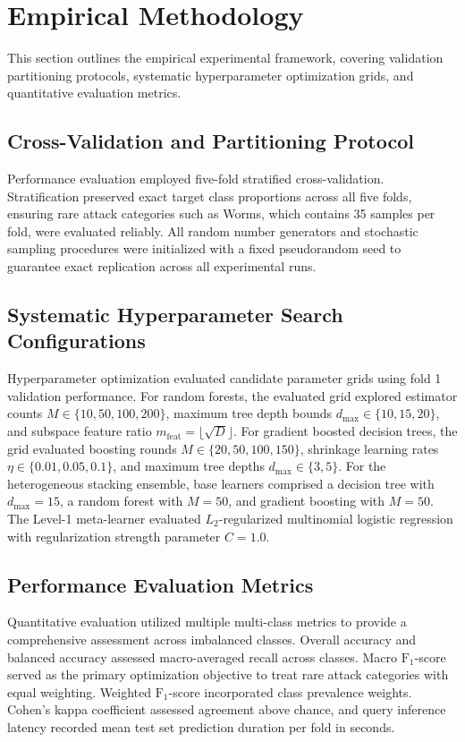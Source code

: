 \documentclass[10pt,conference,compsoc]{IEEEtran}
\begin{document}
\section{Empirical Methodology}

This section outlines the empirical experimental framework, covering validation partitioning protocols, systematic hyperparameter optimization grids, and quantitative evaluation metrics.

\subsection{Cross-Validation and Partitioning Protocol}
Performance evaluation employed five-fold stratified cross-validation. Stratification preserved exact target class proportions across all five folds, ensuring rare attack categories such as Worms, which contains 35 samples per fold, were evaluated reliably. All random number generators and stochastic sampling procedures were initialized with a fixed pseudorandom seed to guarantee exact replication across all experimental runs.

\subsection{Systematic Hyperparameter Search Configurations}
Hyperparameter optimization evaluated candidate parameter grids using fold 1 validation performance. For random forests, the evaluated grid explored estimator counts $M \in \{10, 50, 100, 200\}$, maximum tree depth bounds $d_{\text{max}} \in \{10, 15, 20\}$, and subspace feature ratio $m_{\text{feat}} = \lfloor \sqrt{D} \rfloor$. For gradient boosted decision trees, the grid evaluated boosting rounds $M \in \{20, 50, 100, 150\}$, shrinkage learning rates $\eta \in \{0.01, 0.05, 0.1\}$, and maximum tree depths $d_{\text{max}} \in \{3, 5\}$. For the heterogeneous stacking ensemble, base learners comprised a decision tree with $d_{\text{max}}=15$, a random forest with $M=50$, and gradient boosting with $M=50$. The Level-1 meta-learner evaluated $L_2$-regularized multinomial logistic regression with regularization strength parameter $C=1.0$.

\subsection{Performance Evaluation Metrics}
Quantitative evaluation utilized multiple multi-class metrics to provide a comprehensive assessment across imbalanced classes. Overall accuracy and balanced accuracy assessed macro-averaged recall across classes. Macro $\text{F}_1$-score served as the primary optimization objective to treat rare attack categories with equal weighting. Weighted $\text{F}_1$-score incorporated class prevalence weights. Cohen's kappa coefficient assessed agreement above chance, and query inference latency recorded mean test set prediction duration per fold in seconds.
\end{document}
